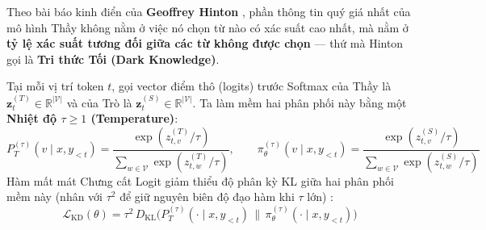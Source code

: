 Theo bài báo kinh điển của \textbf{Geoffrey Hinton} \citep{hinton2015distilling}, phần thông tin quý giá nhất của mô hình Thầy không nằm ở việc nó chọn từ nào có xác suất cao nhất, mà nằm ở \textbf{tỷ lệ xác suất tương đối giữa các từ không được chọn} --- thứ mà Hinton gọi là \textbf{Tri thức Tối (Dark Knowledge)}.

Tại mỗi vị trí token $t$, gọi vector điểm thô (logits) trước Softmax của Thầy là $\mathbf{z}^{(T)}_t \in \mathbb{R}^{|\mathcal{V}|}$ và của Trò là $\mathbf{z}^{(S)}_t \in \mathbb{R}^{|\mathcal{V}|}$. Ta làm mềm hai phân phối này bằng một \textbf{Nhiệt độ $\tau \ge 1$ (Temperature)}:
\begin{equation}
  P_T^{(\tau)}(v \mid x, y_{<t}) = \frac{\exp(z^{(T)}_{t, v} / \tau)}{\sum_{w \in \mathcal{V}} \exp(z^{(T)}_{t, w} / \tau)}, \qquad
  \pi_\theta^{(\tau)}(v \mid x, y_{<t}) = \frac{\exp(z^{(S)}_{t, v} / \tau)}{\sum_{w \in \mathcal{V}} \exp(z^{(S)}_{t, w} / \tau)}
  \label{eq:soft_targets}
\end{equation}
Hàm mất mát Chưng cất Logit giảm thiểu độ phân kỳ KL giữa hai phân phối mềm này (nhân với $\tau^2$ để giữ nguyên biên độ đạo hàm khi $\tau$ lớn) \citep{hinton2015distilling}:
\begin{equation}
  \mathcal{L}_{\text{KD}}(\theta) = \tau^2 \, D_{\text{KL}}\Big( P_T^{(\tau)}(\cdot \mid x, y_{<t}) \,\Big\|\, \pi_\theta^{(\tau)}(\cdot \mid x, y_{<t}) \Big)
  \label{eq:logit_kd_loss}
\end{equation}

